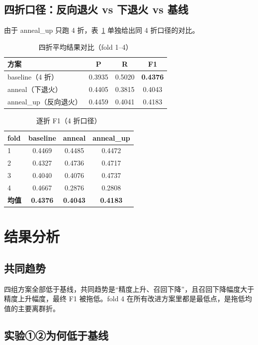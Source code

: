 \documentclass[11pt,a4paper]{ctexart}
\begin{document}
\subsection{四折口径：反向退火 vs 下退火 vs 基线}

由于 anneal\_up 只跑 4 折，表~\ref{tab:main4} 单独给出同 4 折口径的对比。

\begin{table}[H]
\centering
\caption{四折平均结果对比（fold 1--4）}
\label{tab:main4}
\begin{tabular}{lccc}
\toprule
方案 & P & R & F1 \\
\midrule
baseline（4 折） & 0.3935 & 0.5020 & \textbf{0.4376} \\
anneal（下退火） & 0.4405 & 0.3815 & 0.4043 \\
anneal\_up（反向退火） & 0.4459 & 0.4041 & 0.4183 \\
\bottomrule
\end{tabular}
\end{table}

\begin{table}[H]
\centering
\caption{逐折 F1（4 折口径）}
\label{tab:fold4}
\begin{tabular}{lccc}
\toprule
fold & baseline & anneal & anneal\_up \\
\midrule
1 & 0.4469 & 0.4485 & 0.4472 \\
2 & 0.4327 & 0.4736 & 0.4717 \\
3 & 0.4040 & 0.4076 & 0.4737 \\
4 & 0.4667 & 0.2876 & 0.2808 \\
\midrule
\textbf{均值} & \textbf{0.4376} & \textbf{0.4043} & \textbf{0.4183} \\
\bottomrule
\end{tabular}
\end{table}

\section{结果分析}

\subsection{共同趋势}

四组方案全部低于基线，共同趋势是``精度上升、召回下降''，且召回下降幅度大于精度上升幅度，最终 F1 被拖低。fold 4 在所有改进方案里都是最低点，是拖低均值的主要离群折。

\subsection{实验①②为何低于基线}
\end{document}
